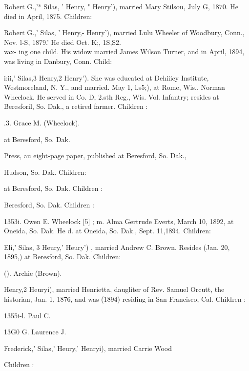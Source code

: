 \documentclass{book}
\begin{document}
Robert G.,'* Silas, ' Henry, " Henry'), married Mary Stilsou, July 
G, 1870. He died in April, 1875. Children: 


Robert G.,' Silas, ' Henry,- Henry'), married Lulu Wheeler of 
Woodbury, Conn., Nov. l-S, 1879.' He died Oct. K;, 1S,S2. \\vax- 
ing one child. His widow married James Wilson Turner, and in 
April, 1894, was living in Danbury, Conn. Child: 


i:ii,' Silas,3 Henry,2 Henry'). She was educated at Dehiiicy 
Institute, Westmoreland, N. Y., and married. May 1, l.s5;), at 
Rome, Wis., Norman Wheelock. He served in Co. D, 2.sth 
Reg., Wis. Vol. Infantry; resides at Beresforil, So. Dak., a 
retired farmer. Children : 




.3. Grace M. (Wheelock). 


at Beresford, So. Dak. 



Press, au eight-page paper, published at Beresford, So. Dak., 



Hudson, So. Dak. Children: 




at Beresford, So. Dak. Children : 






Beresford, So. Dak. Children : 

1353i. Owen E. Wheelock [5] ; m. Alma Gertrude Everts, March 10, 
1892, at Oneida, So. Dak. He d. at Oneida, So. Dak., Sept. 
11,1894. Children: 



Eli,' Silas, 3 Heury,' Heury') , married Andrew C. Brown. Resides 
(Jan. 20, 1895,) at Beresford, So. Dak. Children: 





(). Archie (Brown). 

Henry,2 Heuryi), married Henrietta, daugliter of Rev. Samuel 
Orcutt, the historian, Jan. 1, 1876, and was (1894) residing in 
San Francisco, Cal. Children : 

1355i-l. Paul C. 





13G0 G. Laurence J. 

Frederick,' Silas,' Heury,' Henryi), married Carrie Wood 

Children : 
\end{document}
